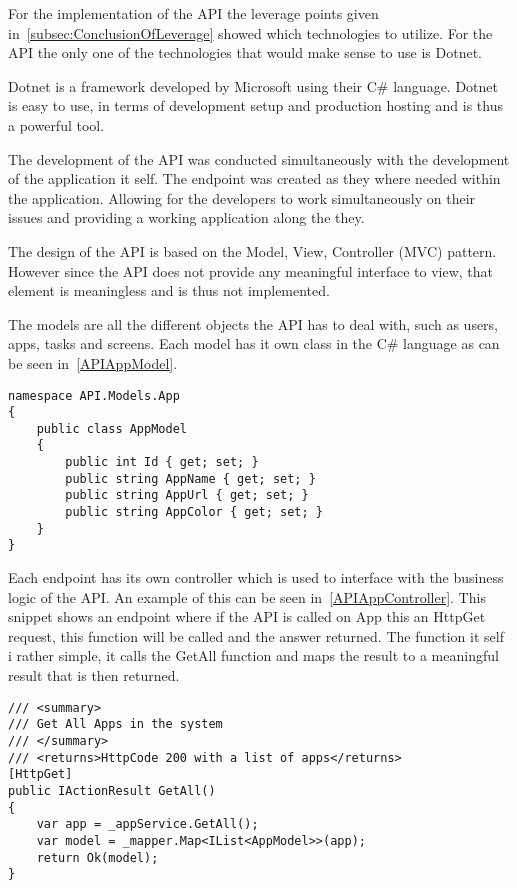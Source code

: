 For the implementation of the API the leverage points given in~\autoref{subsec:ConclusionOfLeverage} showed which technologies to utilize.
For the API the only one of the technologies that would make sense to use is Dotnet.

Dotnet is a framework developed by Microsoft using their C\# language.
Dotnet is easy to use, in terms of development setup and production hosting and is thus a powerful tool\cite{DotnetWebsite}.

The development of the API was conducted simultaneously with the development of the application it self.
The endpoint was created as they where needed within the application.
Allowing for the developers to work simultaneously on their issues and providing a working application along the they.

The design of the API is based on the Model, View, Controller (MVC) pattern\cite{MVC}.
However since the API does not provide any meaningful interface to view, that element is meaningless and is thus not implemented.

The models are all the different objects the API has to deal with, such as users, apps, tasks and screens.
Each model has it own class in the C\# language as can be seen in~\autoref{APIAppModel}.

\begin{lstlisting}[caption={API App model}, label={APIAppModel}, language={CSharp}]
namespace API.Models.App
{
    public class AppModel
    {
        public int Id { get; set; }
        public string AppName { get; set; }
        public string AppUrl { get; set; }
        public string AppColor { get; set; }
    }
}
\end{lstlisting}

Each endpoint has its own controller which is used to interface with the business logic of the API.
An example of this can be seen in~\autoref{APIAppController}.
This snippet shows an endpoint where if the API is called on App this an HttpGet request, this function will be called and the answer returned.
The function it self i rather simple, it calls the GetAll function and maps the result to a meaningful result that is then returned.

\begin{lstlisting}[caption={API App Controller GetAll Function}, label={APIAppController}, language={CSharp}]
/// <summary>
/// Get All Apps in the system
/// </summary>
/// <returns>HttpCode 200 with a list of apps</returns>
[HttpGet]
public IActionResult GetAll()
{
    var app = _appService.GetAll();
    var model = _mapper.Map<IList<AppModel>>(app);
    return Ok(model);
}
\end{lstlisting}

